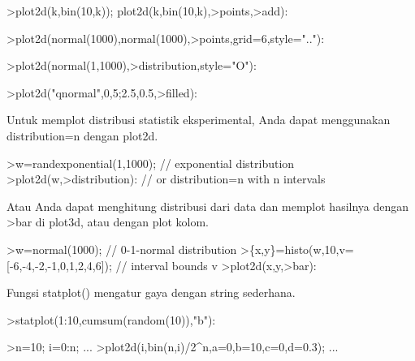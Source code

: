 \documentclass{article}
\begin{document}
\begin{eulernotebook}
\begin{eulercomment}
\begin{eulercomment}
\begin{eulercomment}
\begin{eulercomment}
\begin{eulercomment}
\begin{eulercomment}
\begin{eulercomment}
\begin{eulercomment}
\begin{eulerprompt}
>plot2d(k,bin(10,k)); plot2d(k,bin(10,k),>points,>add):
\end{eulerprompt}
\begin{eulerprompt}
>plot2d(normal(1000),normal(1000),>points,grid=6,style=".."):
\end{eulerprompt}
\begin{eulerprompt}
>plot2d(normal(1,1000),>distribution,style="O"):
\end{eulerprompt}
\begin{eulerprompt}
>plot2d("qnormal",0,5;2.5,0.5,>filled):
\end{eulerprompt}
\begin{eulercomment}
Untuk memplot distribusi statistik eksperimental, Anda dapat
menggunakan distribution=n dengan plot2d.
\end{eulercomment}
\begin{eulerprompt}
>w=randexponential(1,1000); // exponential distribution
>plot2d(w,>distribution): // or distribution=n with n intervals
\end{eulerprompt}
\begin{eulercomment}
Atau Anda dapat menghitung distribusi dari data dan memplot hasilnya
dengan \textgreater{}bar di plot3d, atau dengan plot kolom.
\end{eulercomment}
\begin{eulerprompt}
>w=normal(1000); // 0-1-normal distribution
>\{x,y\}=histo(w,10,v=[-6,-4,-2,-1,0,1,2,4,6]); // interval bounds v
>plot2d(x,y,>bar):
\end{eulerprompt}
\begin{eulercomment}
Fungsi statplot() mengatur gaya dengan string sederhana.
\end{eulercomment}
\begin{eulerprompt}
>statplot(1:10,cumsum(random(10)),"b"):
\end{eulerprompt}
\begin{eulerprompt}
>n=10; i=0:n; ...
>plot2d(i,bin(n,i)/2^n,a=0,b=10,c=0,d=0.3); ...

\end{eulerprompt}
\end{eulercomment}
\end{eulercomment}
\end{eulercomment}
\end{eulercomment}
\end{eulercomment}
\end{eulercomment}
\end{eulercomment}
\end{eulercomment}
\end{eulernotebook}
\end{document}
